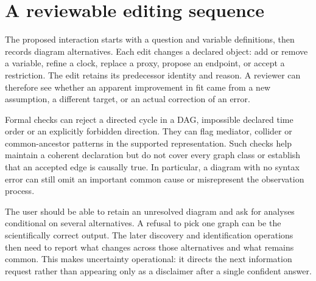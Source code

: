 \section{A reviewable editing sequence}

The proposed interaction starts with a question and variable definitions,
then records diagram alternatives. Each edit changes a declared object:
add or remove a variable, refine a clock, replace a proxy, propose an endpoint,
or accept a restriction. The edit retains its predecessor identity and
reason. A reviewer can therefore see whether an apparent improvement in
fit came from a new assumption, a different target, or an actual correction
of an error.

Formal checks can reject a directed cycle in a DAG, impossible declared
time order or an explicitly forbidden direction. They can flag mediator,
collider or common-ancestor patterns in the supported representation. Such
checks help maintain a coherent declaration but do not cover every graph
class or establish that an accepted edge is causally true. In particular,
a diagram with no syntax error can still omit an important common cause or
misrepresent the observation process.

The user should be able to retain an unresolved diagram and ask for analyses
conditional on several alternatives. A refusal to pick one graph can be the
scientifically correct output. The later discovery and identification
operations then need to report what changes across those alternatives and
what remains common. This makes uncertainty operational: it directs the
next information request rather than appearing only as a disclaimer after
a single confident answer.

